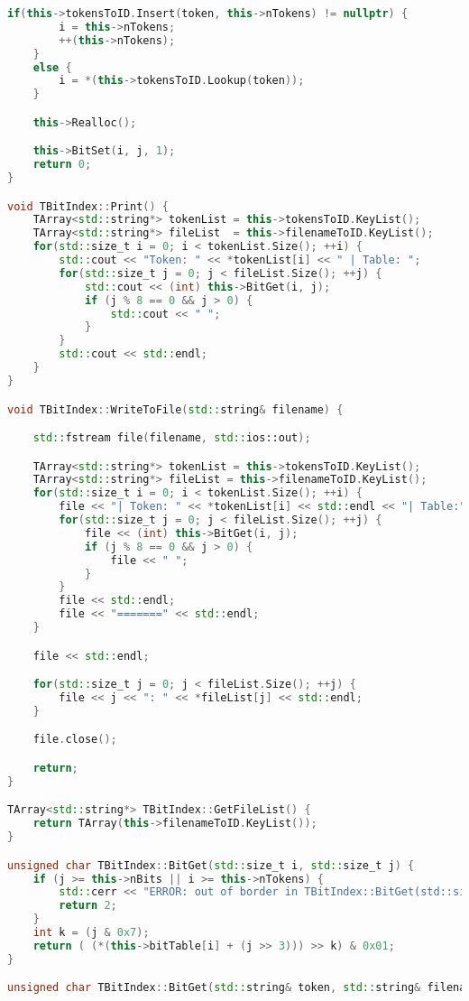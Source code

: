 \begin{lstlisting}[language=C++]
    if(this->tokensToID.Insert(token, this->nTokens) != nullptr) {
        i = this->nTokens;
        ++(this->nTokens);
    }
    else {
        i = *(this->tokensToID.Lookup(token));
    }

    this->Realloc();

    this->BitSet(i, j, 1);
    return 0;
}

void TBitIndex::Print() {
    TArray<std::string*> tokenList = this->tokensToID.KeyList();
    TArray<std::string*> fileList  = this->filenameToID.KeyList();
    for(std::size_t i = 0; i < tokenList.Size(); ++i) {
        std::cout << "Token: " << *tokenList[i] << " | Table: ";
        for(std::size_t j = 0; j < fileList.Size(); ++j) {
            std::cout << (int) this->BitGet(i, j);
            if (j % 8 == 0 && j > 0) {
                std::cout << " ";
            }
        }
        std::cout << std::endl;
    }
}

void TBitIndex::WriteToFile(std::string& filename) {

    std::fstream file(filename, std::ios::out);

    TArray<std::string*> tokenList = this->tokensToID.KeyList();
    TArray<std::string*> fileList = this->filenameToID.KeyList();
    for(std::size_t i = 0; i < tokenList.Size(); ++i) {
        file << "| Token: " << *tokenList[i] << std::endl << "| Table:";
        for(std::size_t j = 0; j < fileList.Size(); ++j) {
            file << (int) this->BitGet(i, j);
            if (j % 8 == 0 && j > 0) {
                file << " ";
            }
        }
        file << std::endl;
        file << "=======" << std::endl;
    }

    file << std::endl;

    for(std::size_t j = 0; j < fileList.Size(); ++j) {
        file << j << ": " << *fileList[j] << std::endl;
    }

    file.close();

    return;
}

TArray<std::string*> TBitIndex::GetFileList() {
    return TArray(this->filenameToID.KeyList());
}

unsigned char TBitIndex::BitGet(std::size_t i, std::size_t j) {
    if (j >= this->nBits || i >= this->nTokens) {
        std::cerr << "ERROR: out of border in TBitIndex::BitGet(std::size_t, std::size_t)!" << std::endl;
        return 2;
    }
    int k = (j & 0x7);
    return ( (*(this->bitTable[i] + (j >> 3))) >> k) & 0x01;
}

unsigned char TBitIndex::BitGet(std::string& token, std::string& filename) {
    

\end{lstlisting}
